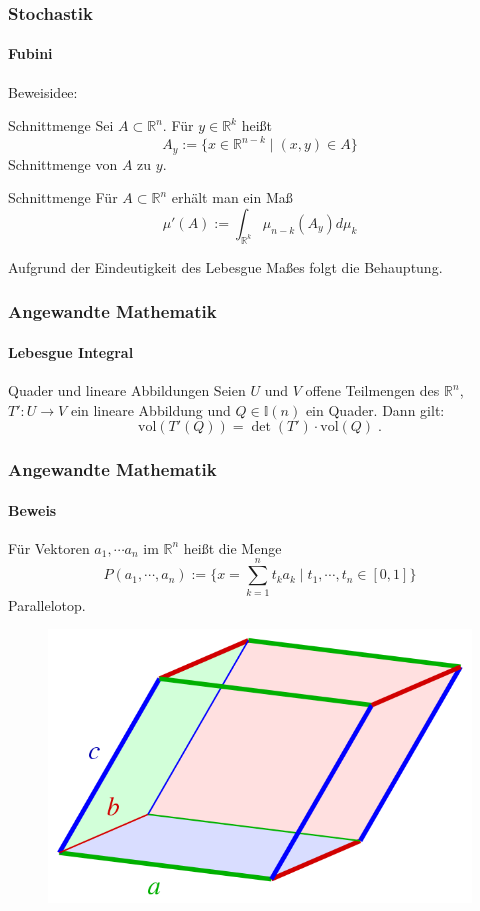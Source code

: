 \documentclass{beamer}
\begin{document}
\begin{frame}
    \frametitle{Stochastik}
\framesubtitle{Fubini}
Beweisidee:

\begin{block}{Schnittmenge}
Sei $ A \subset \mathbb{R}^n$. Für $ y \in \mathbb{R}^k$ heißt
$$ A_y :=  \biggl \{    x \in \mathbb{R}^{n-k}  \; | \;  (x,y) \in A \biggr \}$$  
Schnittmenge von $A$ zu $y$.
\end{block}

\begin{block}{Schnittmenge}
    Für $A \subset \mathbb{R}^n $ erhält man ein Maß
    $$ \mu'(A) := \int_{\mathbb{R}^k} \mu_{n-k}(A_y) d \mu_k$$ 
\end{block}
Aufgrund der Eindeutigkeit des Lebesgue Maßes folgt die Behauptung.
\end{frame}




\begin{frame}
    \frametitle{Angewandte Mathematik}
\framesubtitle{Lebesgue Integral}
\begin{block}{Quader und lineare Abbildungen}
Seien $U$ und $V$ offene Teilmengen des $\mathbb{R}^n$, $T': U \to V$ ein lineare Abbildung und  $Q \in \mathbb{I}(n)$ ein Quader.
Dann gilt:
 $$ \text{vol}  (T'(Q))   =  \det (T') \cdot   \text{vol}(Q) \; .$$
\end{block}
 \end{frame}

\begin{frame}
    \frametitle{Angewandte Mathematik}
\framesubtitle{Beweis}
Für Vektoren $a_1, \cdots a_n$ im $\mathbb{R}^n$ heißt die Menge 
$$ P(a_1, \cdots,  a_n) := \biggl \{  x = \sum_{k=1}^n t_k a_k  \; | \; t_1, \cdots , t_n \in [0,1]  \biggr \}$$
Parallelotop.
\begin{figure}[H]
      \centering
    \includegraphics[width=0.6 \textwidth]{img/640px-Parallelepiped-0}    
\end{figure}
 \end{frame}
\end{document}
